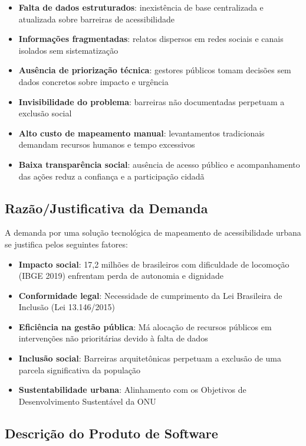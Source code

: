 \documentclass[12pt,a4paper]{article}
\begin{document}
\begin{itemize}
    \item \textbf{Falta de dados estruturados}: inexistência de base centralizada e atualizada sobre barreiras de acessibilidade
    \item \textbf{Informações fragmentadas}: relatos dispersos em redes sociais e canais isolados sem sistematização
    \item \textbf{Ausência de priorização técnica}: gestores públicos tomam decisões sem dados concretos sobre impacto e urgência
    \item \textbf{Invisibilidade do problema}: barreiras não documentadas perpetuam a exclusão social
    \item \textbf{Alto custo de mapeamento manual}: levantamentos tradicionais demandam recursos humanos e tempo excessivos
    \item \textbf{Baixa transparência social}: ausência de acesso público e acompanhamento das ações reduz a confiança e a participação cidadã
\end{itemize}

\subsection{Razão/Justificativa da Demanda}
\label{subsec:razao-justificativa}

A demanda por uma solução tecnológica de mapeamento de acessibilidade urbana se justifica pelos seguintes fatores:

\begin{itemize}
    \item \textbf{Impacto social}: 17,2 milhões de brasileiros com dificuldade de locomoção (IBGE 2019) enfrentam perda de autonomia e dignidade
    \item \textbf{Conformidade legal}: Necessidade de cumprimento da Lei Brasileira de Inclusão (Lei 13.146/2015)
    \item \textbf{Eficiência na gestão pública}: Má alocação de recursos públicos em intervenções não prioritárias devido à falta de dados
    \item \textbf{Inclusão social}: Barreiras arquitetônicas perpetuam a exclusão de uma parcela significativa da população
    \item \textbf{Sustentabilidade urbana}: Alinhamento com os Objetivos de Desenvolvimento Sustentável da ONU
\end{itemize}

\subsection{Descrição do Produto de Software}
\label{subsec:descricao-produto}
\end{document}
